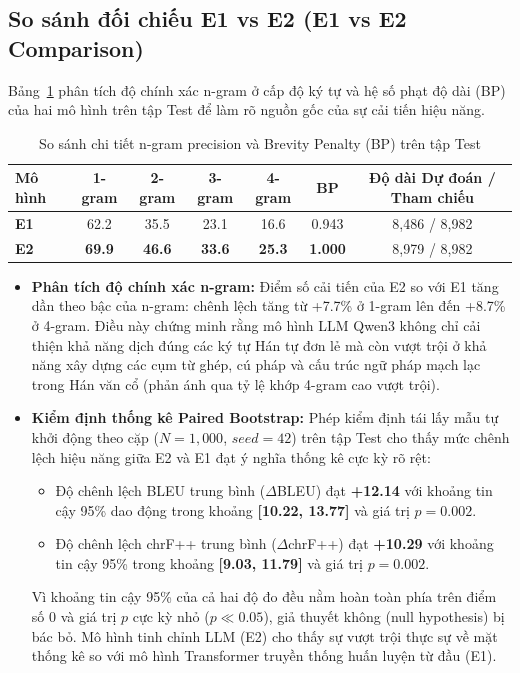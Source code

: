 \subsection{So sánh đối chiếu E1 vs E2 (E1 vs E2 Comparison)}

Bảng~\ref{tab:ngram_precision} phân tích độ chính xác n-gram ở cấp độ ký tự và hệ số phạt độ dài (BP) của hai mô hình trên tập Test để làm rõ nguồn gốc của sự cải tiến hiệu năng.

\begin{table}[htbp]
\centering
\small
\caption{So sánh chi tiết n-gram precision và Brevity Penalty (BP) trên tập Test}
\label{tab:ngram_precision}
\begin{tabular}{lcccccc}
\toprule
\textbf{Mô hình} & \textbf{1-gram} & \textbf{2-gram} & \textbf{3-gram} & \textbf{4-gram} & \textbf{BP} & \textbf{Độ dài Dự đoán / Tham chiếu} \\
\midrule
\textbf{E1} & 62.2 & 35.5 & 23.1 & 16.6 & 0.943 & 8,486 / 8,982 \\
\textbf{E2} & \textbf{69.9} & \textbf{46.6} & \textbf{33.6} & \textbf{25.3} & \textbf{1.000} & 8,979 / 8,982 \\ \bottomrule
\end{tabular}
\end{table}

\begin{itemize}
    \item \textbf{Phân tích độ chính xác n-gram:} Điểm số cải tiến của E2 so với E1 tăng dần theo bậc của n-gram: chênh lệch tăng từ +7.7\% ở 1-gram lên đến +8.7\% ở 4-gram. Điều này chứng minh rằng mô hình LLM Qwen3 không chỉ cải thiện khả năng dịch đúng các ký tự Hán tự đơn lẻ mà còn vượt trội ở khả năng xây dựng các cụm từ ghép, cú pháp và cấu trúc ngữ pháp mạch lạc trong Hán văn cổ (phản ánh qua tỷ lệ khớp 4-gram cao vượt trội).
    \item \textbf{Kiểm định thống kê Paired Bootstrap:}
    Phép kiểm định tái lấy mẫu tự khởi động theo cặp ($N = 1,000$, $seed = 42$) trên tập Test cho thấy mức chênh lệch hiệu năng giữa E2 và E1 đạt ý nghĩa thống kê cực kỳ rõ rệt:
    \begin{itemize}
        \item Độ chênh lệch BLEU trung bình ($\Delta$BLEU) đạt \textbf{+12.14} với khoảng tin cậy 95\% dao động trong khoảng \textbf{[10.22, 13.77]} và giá trị $p = 0.002$.
        \item Độ chênh lệch chrF++ trung bình ($\Delta$chrF++) đạt \textbf{+10.29} với khoảng tin cậy 95\% trong khoảng \textbf{[9.03, 11.79]} và giá trị $p = 0.002$.
    \end{itemize}
    Vì khoảng tin cậy 95\% của cả hai độ đo đều nằm hoàn toàn phía trên điểm số 0 và giá trị $p$ cực kỳ nhỏ ($p \ll 0.05$), giả thuyết không (null hypothesis) bị bác bỏ. Mô hình tinh chỉnh LLM (E2) cho thấy sự vượt trội thực sự về mặt thống kê so với mô hình Transformer truyền thống huấn luyện từ đầu (E1).
\end{itemize}

